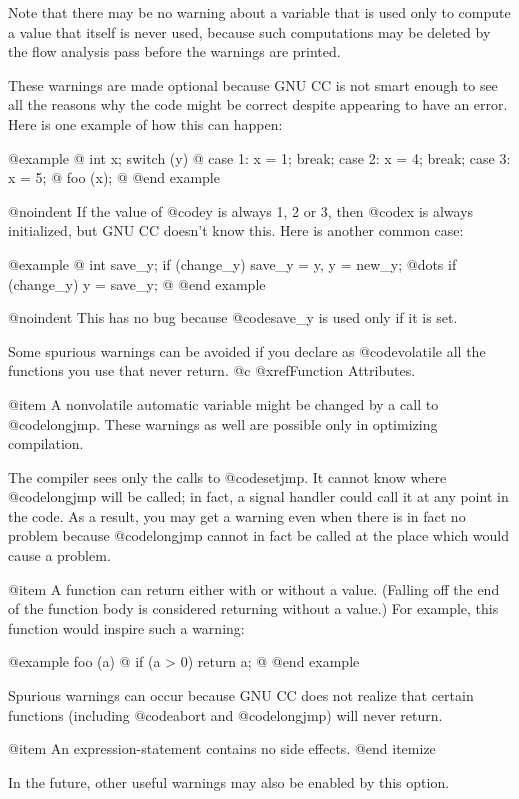{Note that there may be no warning about a variable that is used
only to compute a value that itself is never used, because such
computations may be deleted by the flow analysis pass before the
warnings are printed.

These warnings are made optional because GNU CC is not smart
enough to see all the reasons why the code might be correct
despite appearing to have an error.  Here is one example of how
this can happen:

@example
@{
  int x;
  switch (y)
    @{
    case 1: x = 1;
      break;
    case 2: x = 4;
      break;
    case 3: x = 5;
    @}
  foo (x);
@}
@end example

@noindent
If the value of @code{y} is always 1, 2 or 3, then @code{x} is
always initialized, but GNU CC doesn't know this.  Here is
another common case:

@example
@{
  int save_y;
  if (change_y) save_y = y, y = new_y;
  @dots{}
  if (change_y) y = save_y;
@}
@end example

@noindent
This has no bug because @code{save_y} is used only if it is set.

Some spurious warnings can be avoided if you declare as
@code{volatile} all the functions you use that never return.
@c @xref{Function Attributes}.

@item
A nonvolatile automatic variable might be changed by a call to
@code{longjmp}.  These warnings as well are possible only in
optimizing compilation.

The compiler sees only the calls to @code{setjmp}.  It cannot know
where @code{longjmp} will be called; in fact, a signal handler could
call it at any point in the code.  As a result, you may get a warning
even when there is in fact no problem because @code{longjmp} cannot
in fact be called at the place which would cause a problem.

@item
A function can return either with or without a value.  (Falling
off the end of the function body is considered returning without
a value.)  For example, this function would inspire such a
warning:

@example
foo (a)
@{
  if (a > 0)
    return a;
@}
@end example

Spurious warnings can occur because GNU CC does not realize that
certain functions (including @code{abort} and @code{longjmp})
will never return.

@item
An expression-statement contains no side effects.
@end itemize

In the future, other useful warnings may also be enabled by this
option.

}
